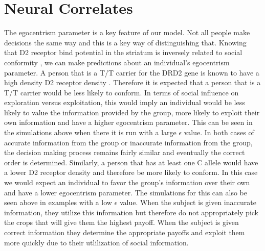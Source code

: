 \documentclass[11pt, a4paper]{article}
\begin{document}
\section{Neural Correlates}
The egocentrism parameter is a key feature of our model. Not all people make decisions the same way and this is a key way of distinguishing that. Knowing that D2 receptor bind potential in the striatum is inversely related to social conformity \cite{Sigray2014}, we can make predictions about an individual's egocentrism parameter. A person that is a T/T carrier for the DRD2 gene is known to have a high density D2 receptor density \cite{Frank2009}. Therefore it is expected that a person that is a T/T carrier would be less likely to conform. In terms of social influence on exploration versus exploitation, this would imply an individual would be less likely to value the information provided by the group, more likely to exploit their own information and have a higher egocentrism parameter. This can be seen in the simulations above when there it is run with a large $\epsilon$ value. In both cases of accurate information from the group or inaccurate information from the group, the decision making process remains fairly similar and eventually the correct order is determined. Similarly, a person that has at least one C allele would have a lower D2 receptor density and therefore be more likely to conform. In this case we would expect an individual to favor the group's information over their own and have a lower egocentrism parameter. The simulations for this can also be seen above in examples with a low $\epsilon$ value. When the subject is given inaccurate information, they utilize this information but therefore do not appropriately pick the crops that will give them the highest payoff. When the subject is given correct information they determine the appropriate payoffs and exploit them more quickly due to their utlilization of social information.
\end{document}
